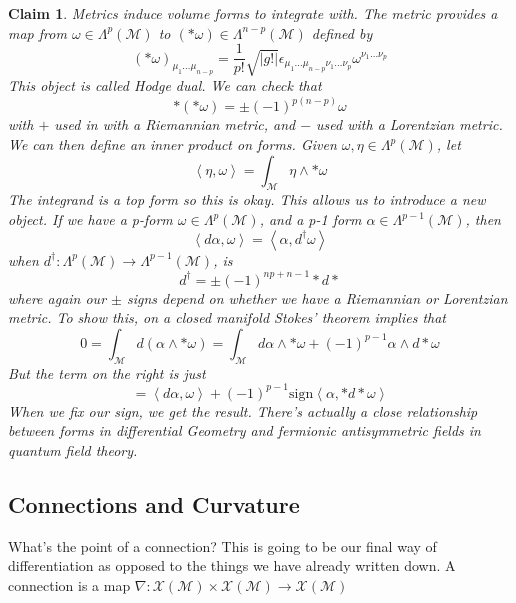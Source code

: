 \documentclass[11pt, a4paper]{article}   	%
\theoremstyle{slplain}
\newtheorem*{claim}{Claim}
\begin{document}
\begin{claim}{Metrics induce volume forms to integrate with.}
The metric provides a map from $ \omega  \in \Lambda^p ( \mathcal{ M } ) $
to $ ( * \omega ) \in \Lambda ^{ n - p } ( \mathcal{ M } ) $  defined by
\[
 ( * \omega )_{ \mu_1 \dots \mu_{ n - p }  } = \frac{1}{p! } \sqrt{  | g ! | }  \epsilon_{ \mu_1 \dots \mu_{ n - p } \nu_1 \dots \nu_{ p } } \omega^{ \nu_1 \dots \nu_{ p } }
\] This object is called Hodge dual. We can check that 
\[
	* ( * \omega ) = \pm ( -1) ^{ p ( n - p ) } \omega 
\] with $ + $ used in with a Riemannian metric, and $ - $ used 
with a Lorentzian metric. 
We can then define an inner product on forms. 
Given $ \omega, \eta \in \Lambda ^ p ( \mathcal{ M } ) $, let
\[
 \left< \eta , \omega  \right>  = \int_{ \mathcal{ M } } \eta \wedge  * \omega 
\] The integrand is a top form so this is okay. 
This allows us to introduce a new object. 
If we have a p-form $ \omega \in \Lambda ^ p ( \mathcal{ M } ) $, and a 
p-1 form $ \alpha \in \Lambda ^{ p - 1 }( \mathcal{ M } )  $, then 
\[
 \left< d\alpha, \omega    \right> = \left< \alpha, d^ \dagger \omega \right>
\] when $ d ^ \dagger : \Lambda ^ p ( \mathcal{ M } ) \to \Lambda ^{ p -1 } ( \mathcal{ M } ) $, is 
\[
 d^ \dagger  = \pm ( - 1)^{ np + n - 1 } * d * 
\] where again our $ \pm $ signs depend on whether we have 
a Riemannian or Lorentzian metric. 
To show this, on a closed manifold Stokes' theorem implies that 
\[
	0 = \int_{ \mathcal{ M } } d ( \alpha \wedge  * \omega )  = \int_{ \mathcal{ M } } d \alpha \wedge  * \omega + ( - 1) ^{ p - 1 }\alpha \wedge  d * \omega 
\] But the term on the right is just 
\[
	= \left< d\alpha , \omega  \right> + ( - 1 ) ^{ p - 1 } \text{sign} \left<\alpha, * d * \omega  \right>
\] When we fix our sign, we 
get the result. 
There's actually a close relationship between forms in differential 
Geometry and fermionic antisymmetric fields in quantum field theory.
\end{claim} 

\subsection{Connections and Curvature} 
What's the point of a connection? 
This is going to be our final way of differentiation as opposed to 
the things we have already written down. 
A connection is a map $ \nabla  : \mathcal{ X } ( \mathcal{ M } ) \times \mathcal{ X } ( \mathcal{ M } ) \to \mathcal{ X } ( \mathcal{ M } ) $
\end{document}
